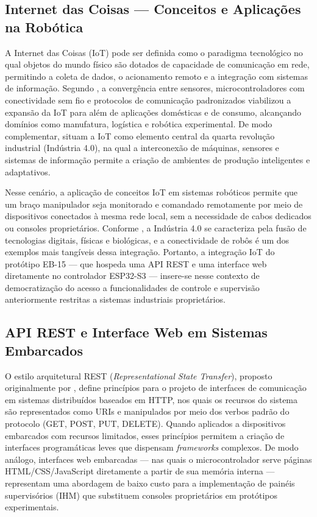 \subsection{Internet das Coisas — Conceitos e Aplicações na Robótica}

A Internet das Coisas (IoT) pode ser definida como o paradigma tecnológico no qual objetos do mundo físico são dotados de capacidade de comunicação em rede, permitindo a coleta de dados, o acionamento remoto e a integração com sistemas de informação. Segundo , a convergência entre sensores, microcontroladores com conectividade sem fio e protocolos de comunicação padronizados viabilizou a expansão da IoT para além de aplicações domésticas e de consumo, alcançando domínios como manufatura, logística e robótica experimental. De modo complementar,  situam a IoT como elemento central da quarta revolução industrial (Indústria 4.0), na qual a interconexão de máquinas, sensores e sistemas de informação permite a criação de ambientes de produção inteligentes e adaptativos.

Nesse cenário, a aplicação de conceitos IoT em sistemas robóticos permite que um braço manipulador seja monitorado e comandado remotamente por meio de dispositivos conectados à mesma rede local, sem a necessidade de cabos dedicados ou consoles proprietários. Conforme , a Indústria 4.0 se caracteriza pela fusão de tecnologias digitais, físicas e biológicas, e a conectividade de robôs é um dos exemplos mais tangíveis dessa integração. Portanto, a integração IoT do protótipo EB-15 — que hospeda uma API REST e uma interface web diretamente no controlador ESP32-S3 — insere-se nesse contexto de democratização do acesso a funcionalidades de controle e supervisão anteriormente restritas a sistemas industriais proprietários.

\subsection{API REST e Interface Web em Sistemas Embarcados}

O estilo arquitetural REST (\textit{Representational State Transfer}), proposto originalmente por , define princípios para o projeto de interfaces de comunicação em sistemas distribuídos baseados em HTTP, nos quais os recursos do sistema são representados como URIs e manipulados por meio dos verbos padrão do protocolo (GET, POST, PUT, DELETE). Quando aplicados a dispositivos embarcados com recursos limitados, esses princípios permitem a criação de interfaces programáticas leves que dispensam \textit{frameworks} complexos. De modo análogo, interfaces web embarcadas — nas quais o microcontrolador serve páginas HTML/CSS/JavaScript diretamente a partir de sua memória interna — representam uma abordagem de baixo custo para a implementação de painéis supervisórios (IHM) que substituem consoles proprietários em protótipos experimentais.

